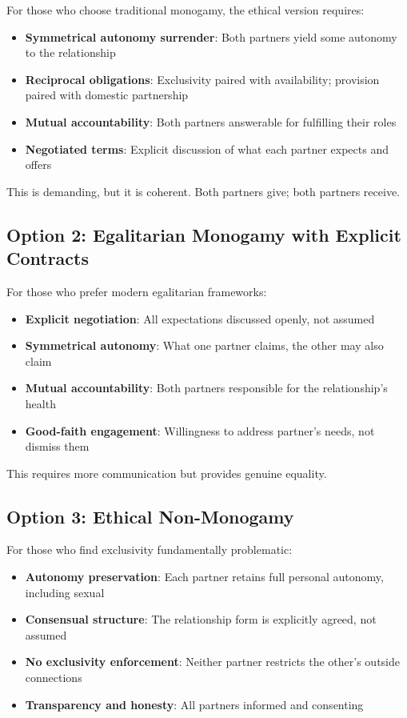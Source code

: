 \documentclass[12pt, letterpaper]{article}
\begin{document}
For those who choose traditional monogamy, the ethical version requires:

\begin{itemize}
    \item \textbf{Symmetrical autonomy surrender}: Both partners yield some autonomy to the relationship
    \item \textbf{Reciprocal obligations}: Exclusivity paired with availability; provision paired with domestic partnership
    \item \textbf{Mutual accountability}: Both partners answerable for fulfilling their roles
    \item \textbf{Negotiated terms}: Explicit discussion of what each partner expects and offers
\end{itemize}

This is demanding, but it is coherent. Both partners give; both partners receive.

\subsection{Option 2: Egalitarian Monogamy with Explicit Contracts}

For those who prefer modern egalitarian frameworks:

\begin{itemize}
    \item \textbf{Explicit negotiation}: All expectations discussed openly, not assumed
    \item \textbf{Symmetrical autonomy}: What one partner claims, the other may also claim
    \item \textbf{Mutual accountability}: Both partners responsible for the relationship's health
    \item \textbf{Good-faith engagement}: Willingness to address partner's needs, not dismiss them
\end{itemize}

This requires more communication but provides genuine equality.

\subsection{Option 3: Ethical Non-Monogamy}

For those who find exclusivity fundamentally problematic:

\begin{itemize}
    \item \textbf{Autonomy preservation}: Each partner retains full personal autonomy, including sexual
    \item \textbf{Consensual structure}: The relationship form is explicitly agreed, not assumed
    \item \textbf{No exclusivity enforcement}: Neither partner restricts the other's outside connections
    \item \textbf{Transparency and honesty}: All partners informed and consenting
\end{itemize}
\end{document}
